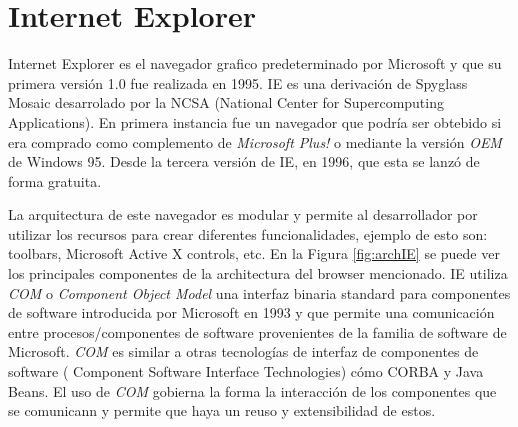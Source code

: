 

\section{Internet Explorer}
    \label{chap3:IE}
    Internet Explorer es el navegador grafico predeterminado por Microsoft y que su primera versión 1.0 fue realizada en 1995. IE es una derivación de Spyglass Mosaic desarrolado por la NCSA (National Center for Supercomputing Applications). En primera instancia fue un navegador que podría ser obtebido si era comprado como complemento de \textit{Microsoft Plus!} o mediante la versión \textit{OEM} de Windows 95. Desde la tercera versión de IE, en 1996, que esta se lanzó de forma gratuita.
            
    La arquitectura de este navegador es modular y permite al desarrollador por utilizar los recursos para crear diferentes funcionalidades, ejemplo de esto son: toolbars, Microsoft Active X controls, etc. En la Figura \ref{fig:archIE} \cite{IEArch} se puede ver los principales componentes de la architectura del browser mencionado. IE utiliza \textit{COM} o \textit{Component Object Model} una interfaz binaria standard para componentes de software introducida por Microsoft en 1993 y que permite una comunicación entre procesos/componentes de software provenientes de la familia de software de Microsoft. \textit{COM} es similar a otras tecnologías de interfaz de componentes de software ( Component Software Interface Technologies) cómo CORBA y Java Beans. El uso de \textit{COM} gobierna la forma la interacción de los componentes que se comunicann y permite que haya un reuso y extensibilidad de estos.
            
